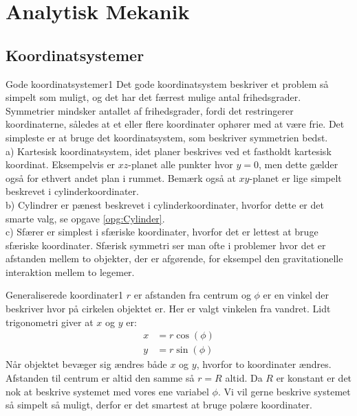 \chapter{Analytisk Mekanik}
%
%
\section*{Koordinatsystemer}
\begin{opgave}{Gode koordinatsystemer}{1}
\opg Det gode koordinatsystem beskriver et problem så simpelt som muligt, og det har det færrest mulige antal frihedsgrader.
\opg Symmetrier mindsker antallet af frihedsgrader, fordi det restringerer koordinaterne, således at et eller flere koordinater ophører med at være frie.
\opg Det simpleste er at bruge det koordinatsystem, som beskriver symmetrien bedst. \\
a) Kartesisk koordinatsystem, idet planer beskrives ved et fastholdt kartesisk koordinat. Eksempelvis er $xz$-planet alle punkter hvor $y=0$, men dette gælder også for ethvert andet plan i rummet. Bemærk også at $xy$-planet er lige simpelt beskrevet i cylinderkoordinater. \\
b) Cylindrer er pænest beskrevet i cylinderkoordinater, hvorfor dette er det smarte valg, se opgave \ref{opg:Cylinder}. \\
c) Sfærer er simplest i sfæriske koordinater, hvorfor det er lettest at bruge sfæriske koordinater. Sfærisk symmetri ser man ofte i problemer hvor det er afstanden mellem to objekter, der er afgørende, for eksempel den gravitationelle interaktion mellem to legemer.
\end{opgave}
%
%
\begin{opgave}{Generaliserede koordinater}{1}
\opg $r$ er afstanden fra centrum og $\phi$ er en vinkel der beskriver hvor på cirkelen objektet er. Her er valgt vinkelen fra vandret. Lidt trigonometri giver at $x$ og $y$ er:
\begin{align*}
	x &= r\cos(\phi)\\
	y &= r\sin(\phi)
\end{align*}
\opg Når objektet bevæger sig ændres både $x$ og $y$, hvorfor to koordinater ændres.
\opg Afstanden til centrum er altid den samme så $r=R$ altid.
\opg Da $R$ er konstant er det nok at beskrive systemet med vores ene variabel $\phi$.
\opg Vi vil gerne beskrive systemet så simpelt så muligt, derfor er det smartest at bruge polære koordinater.
\end{opgave}
%
%
